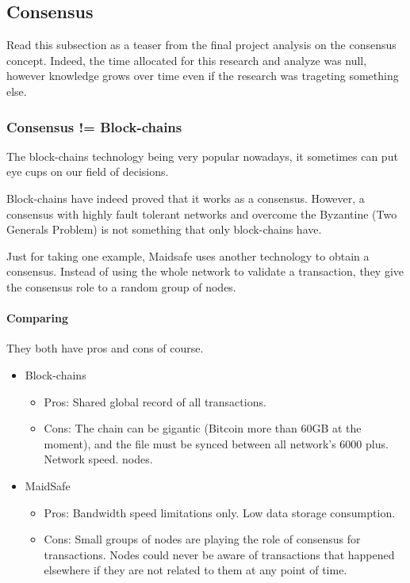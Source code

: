 
\subsection{Consensus}
Read this subsection as a teaser from the final project analysis on the consensus concept. Indeed, the time allocated for this research and analyze was null, however knowledge grows over time even if the research was trageting something else.

\subsubsection{Consensus != Block-chains}
The block-chains technology being very popular nowadays, it sometimes can put eye cups on our field of decisions.

Block-chains have indeed proved that it works as a consensus. However, a consensus with highly fault tolerant networks and overcome the Byzantine (Two Generals Problem) is not something that only block-chains have.

Just for taking one example, Maidsafe\cite{MaidSafe2014MaidSafe.netCommunity} uses another technology to obtain a consensus\cite{Nick2015CONSENSUSBLOCKCHAIN}. Instead of using the whole network to validate a transaction, they give the consensus role to a random group of nodes.

\paragraph{Comparing} They both have pros and cons of course.
\begin{itemize}
\item Block-chains
\begin{itemize}
\item Pros: Shared global record of all transactions.
\item Cons: The chain can be gigantic (Bitcoin more than 60GB at the moment), and the file must be synced between all network’s 6000 plus. Network speed. nodes\cite{AyeowchGLOBALDISTRIBUTION}.
\end{itemize}
\end{itemize}
\begin{itemize}
\item MaidSafe
\begin{itemize}
\item Pros: Bandwidth speed limitations only. Low data storage consumption.
\item Cons: Small groups of nodes are playing the role of consensus for transactions. Nodes could never be aware of transactions that happened elsewhere if they are not related to them at any point of time.
\end{itemize}
\end{itemize}

